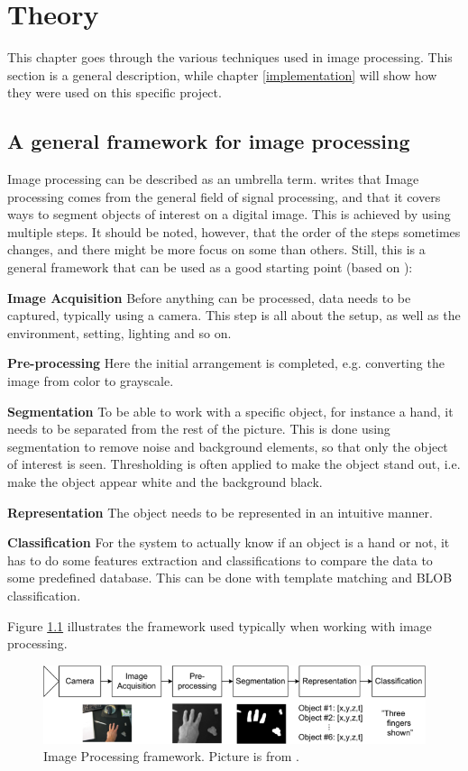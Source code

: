 \chapter{Theory}\label{theory_part}
This chapter goes through the various techniques used in image processing. This section is a general description, while chapter \ref{implementation} will show how they were used on this specific project.

\section{A general framework for image processing}
Image processing can be described as an umbrella term. \citep{ip_book} writes that Image processing comes from the general field of signal processing, and that it covers ways to segment objects of interest on a digital image. This is achieved by using multiple steps. It should be noted, however, that the order of the steps sometimes changes, and there might be more focus on some than others. Still, this is a general framework that can be used as a good starting point (based on \citep{ip_book}):

\textbf{Image Acquisition}
Before anything can be processed, data needs to be captured, typically using a camera. This step is all about the setup, as well as the environment, setting, lighting and so on.

\textbf{Pre-processing}
Here the initial arrangement is completed, e.g. converting the image from color to grayscale.

\textbf{Segmentation}
To be able to work with a specific object, for instance a hand, it needs to be separated from the rest of the picture. This is done using segmentation to remove noise and background elements, so that only the object of interest is seen. Thresholding is often applied to make the object stand out, i.e. make the object appear white and the background black.

\textbf{Representation}
The object needs to be represented in an intuitive manner.

\textbf{Classification}
For the system to actually know if an object is a hand or not, it has to do some features extraction and classifications to compare the data to some predefined database. This can be done with template matching and BLOB classification.

Figure \ref{fig:ip_framework} illustrates the framework used typically when working with image processing.

\begin{figure}[htbp]
\centering
\includegraphics[width=1.00\textwidth]{Pictures/Theory/imageProcessing_steps.png}
\caption{Image Processing framework. Picture is from \citep{ip_book}.}
\label{fig:ip_framework}
\end{figure}

